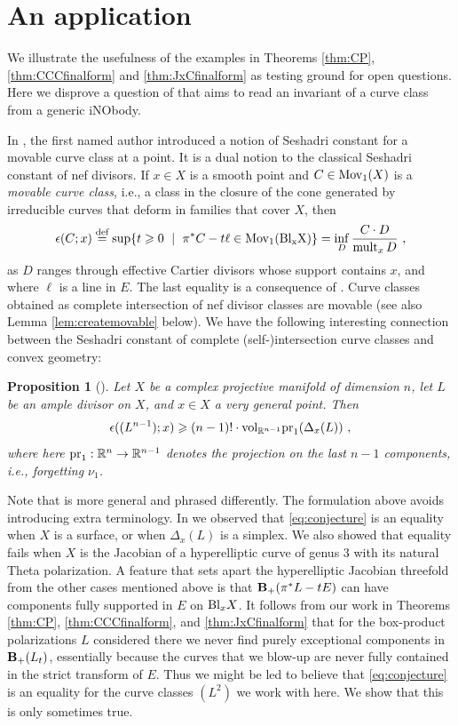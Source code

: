 \documentclass[12pt]{amsart}
\newtheorem{proposition}[lemma]{Proposition}
\theoremstyle{definition}
\newcommand{\bb}{\ensuremath{\mathfrak{b}}}
\renewcommand{\geq}{\geqslant}
\DeclareMathOperator{\mult}{mult}
\newcommand{\deq}{\ensuremath{\stackrel{\textrm{def}}{=}}}
\newcommand{\inob}[2]{\ensuremath{{\Delta}_{#1}(#2)}}
\newcommand{\?}{ \circled{{\large\bf ?}}}
\let\bb\mathbb
\begin{document}
\section{An application}

We illustrate the usefulness of the examples in Theorems \ref{thm:CP}, \ref{thm:CCCfinalform} and \ref{thm:JxCfinalform} as testing ground for open questions. Here we disprove a question of \cite{FLgeneralities} that aims to read an invariant of a curve class from a generic iNObody.

In \cite{Ful21}, the first named author introduced a notion of Seshadri constant for a movable curve class at a point. It is a dual notion to the classical Seshadri constant of nef divisors. If $x\in X$ is a smooth point and $C\in{\rm Mov}_1(X)$ is a \emph{movable curve class}, i.e., a class in the closure of the cone generated by irreducible curves that deform in families that cover $X$, then
\[\epsilon(C;x)\deq\sup\{t\geq 0\ \mid\ \pi^*C-t\ell\in{\rm Mov}_1({\rm Bl_xX})\}=\inf_D\frac{C\cdot D}{\mult_xD}\ ,\]
as $D$ ranges through effective Cartier divisors whose support contains $x$, and where $\ell$ is a line in $E$. The last equality is a consequence of \cite{BDPP}. Curve classes obtained as complete intersection of nef divisor classes are movable (see also Lemma \ref{lem:createmovable} below). We have the following interesting connection between the Seshadri constant of complete (self-)intersection curve classes and convex geometry:

\begin{proposition}[{\cite[Theorem 6.2.(3)]{FLgeneralities}}]
	Let $X$ be a complex projective manifold of dimension $n$, let $L$ be an ample divisor on $X$, and $x\in X$ a very general point. Then 
	\begin{equation}\label{eq:conjecture}\epsilon((L^{n-1});x)\geq (n-1)!\cdot{\rm vol}_{\bb R^{n-1}}{\rm pr}_1(\inob{x}{L})\ ,\end{equation} 
	where here ${\rm pr}_1:\bb R^n\to \bb R^{n-1}$ denotes the projection on the last $n-1$ components, i.e., forgetting $\nu_1$.
\end{proposition}


 Note that \cite[Theorem 6.2]{FLgeneralities} is more general and phrased differently. The formulation above avoids introducing extra terminology.
In \cite[\S6]{FLgeneralities} we observed that \eqref{eq:conjecture} is an equality when $X$ is a surface, or when $\inob{x}{L}$ is a simplex. We also showed that equality fails when $X$ is the Jacobian of a hyperelliptic curve of genus 3 with its natural Theta polarization.
A feature that sets apart the hyperelliptic Jacobian threefold from the other cases mentioned above is that ${\bf B}_+(\pi^*L-tE)$ can have components fully supported in $E$ on ${\rm Bl}_xX$. 
It follows from our work in Theorems \ref{thm:CP}, \ref{thm:CCCfinalform}, and \ref{thm:JxCfinalform} that for the box-product polarizations $L$ considered there we never find purely exceptional components in ${\bf B}_+(L_t)$, essentially because the curves that we blow-up are never fully contained in the strict transform of $E$.
Thus we might be led to believe that \eqref{eq:conjecture} is an equality for the curve classes $(L^2)$ we work with here. We show that this is only sometimes true.
\end{document}

